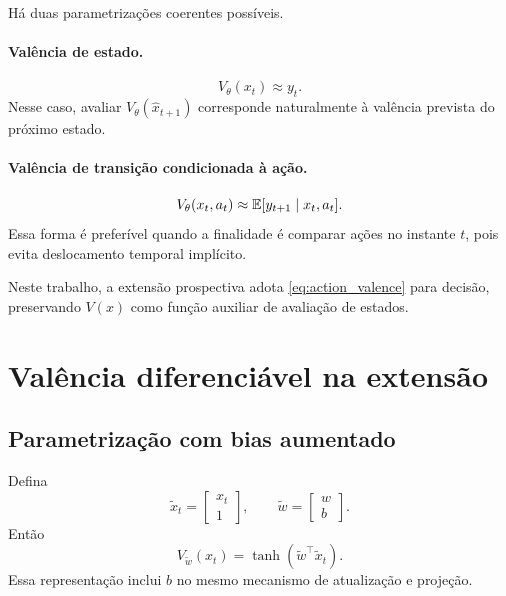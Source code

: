 Há duas parametrizações coerentes possíveis.

\paragraph{Valência de estado.}
\begin{equation}
V_\theta(x_t)\approx y_t.
\end{equation}
Nesse caso, avaliar \(V_\theta(\widehat x_{t+1})\) corresponde naturalmente à valência prevista do próximo estado.

\paragraph{Valência de transição condicionada à ação.}
\begin{equation}
V_\theta(x_t,a_t)\approx\operatorname{\mathbb{E}}[y_{t+1}\mid x_t,a_t].
\label{eq:action_valence}
\end{equation}
Essa forma é preferível quando a finalidade é comparar ações no instante \(t\), pois evita deslocamento temporal implícito.

Neste trabalho, a extensão prospectiva adota \eqref{eq:action_valence} para decisão, preservando \(V(x)\) como função auxiliar de avaliação de estados.

\section{Valência diferenciável na extensão \EVPM}

\subsection{Parametrização com bias aumentado}

Defina
\begin{equation}
\widetilde x_t=
\begin{bmatrix}
x_t\\1
\end{bmatrix},
\qquad
\widetilde w=
\begin{bmatrix}
w\\b
\end{bmatrix}.
\end{equation}
Então
\begin{equation}
V_{\widetilde w}(x_t)=\tanh(\widetilde w^\top\widetilde x_t).
\label{eq:valence_advanced}
\end{equation}
Essa representação inclui \(b\) no mesmo mecanismo de atualização e projeção.

